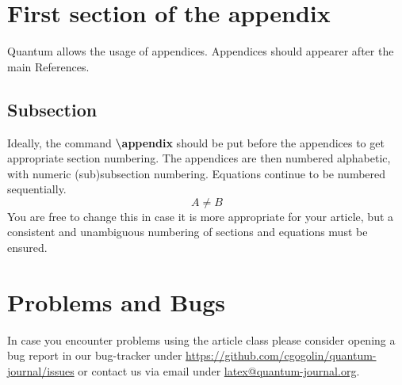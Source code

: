 \documentclass[prx,a4paper,aps,twocolumn,superscriptaddress,11pt]{quantumarticle}
\begin{document}
\appendix

\section{First section of the appendix}
Quantum allows the usage of appendices.
Appendices should appearer after the main References.

\subsection{Subsection}
Ideally, the command \textbf{\textbackslash{}appendix} should be put before the appendices to get appropriate section numbering.
The appendices are then numbered alphabetic, with numeric (sub)subsection numbering.
Equations continue to be numbered sequentially. 
\begin{equation}
  A \neq B
\end{equation}
You are free to change this in case it is more appropriate for your article, but a consistent and unambiguous numbering of sections and equations must be ensured.

\section{Problems and Bugs}
In case you encounter problems using the article class please consider opening a bug report in our bug-tracker under \href{https://github.com/cgogolin/quantum-journal/issues}{https://github.com/cgogolin/quantum-journal/issues} or contact us via email under \href{mailto:latex@quantum-journal.org}{latex@quantum-journal.org}. 
\end{document}

